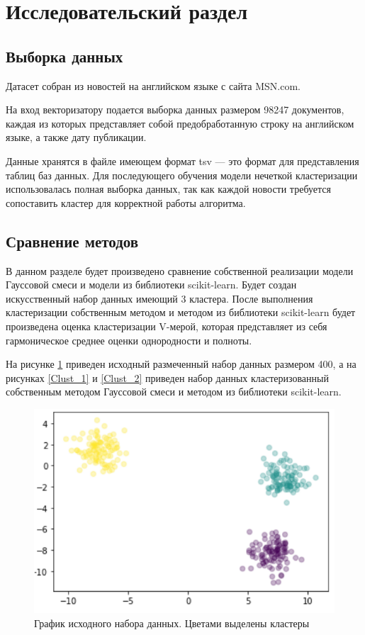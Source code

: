 \section{Исследовательский раздел}

\subsection{Выборка данных}

Датасет собран из новостей на английском языке с сайта MSN.com. \cite{msn}

На вход векторизатору подается выборка данных размером 98247 документов, каждая из которых представляет собой предобработанную строку на английском языке, а также дату публикации.

Данные хранятся в файле имеющем формат tsv --- это формат для представления таблиц баз данных. Для последующего обучения модели нечеткой кластеризации использовалась полная выборка данных, так как каждой новости требуется сопоставить кластер для корректной работы алгоритма.

\subsection{Сравнение методов}

В данном разделе будет произведено сравнение собственной реализации модели Гауссовой смеси и модели из библиотеки scikit-learn. Будет создан искусственный набор данных имеющий 3 кластера. После выполнения кластеризации собственным методом и методом из библиотеки scikit-learn будет произведена оценка кластеризации V-мерой, которая представляет из себя гармоническое среднее оценки однородности и полноты.

На рисунке \ref{Clust_0} приведен исходный размеченный набор данных размером 400, а на рисунках \ref{Clust_1} и \ref{Clust_2} приведен набор данных кластеризованный собственным методом Гауссовой смеси и методом из библиотеки scikit-learn.

\begin{figure}[H]
	\centering
	\includegraphics[width=\textwidth]{img/Clust_0.pdf}
	\caption{График исходного набора данных. Цветами выделены кластеры}
	\label{Clust_0}
\end{figure}  

